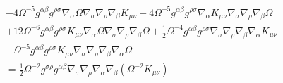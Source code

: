 \documentclass[10pt,letterpaper]{article}
\begin{document}
\begin{align}
 &- 4\Omega^{-5} g^{\alpha \beta} g^{\rho \sigma} \nabla_{\alpha}\Omega \nabla_{\sigma}\nabla_{\rho}\nabla_{\beta}K_{\mu \nu}- 4 \Omega^{-5}g^{\alpha \beta} g^{\rho \sigma} \nabla_{\alpha}K_{\mu \nu} \nabla_{\sigma}\nabla_{\rho}\nabla_{\beta}\Omega\nonumber \\
 & + 12\Omega^{-6} g^{\alpha \beta} g^{\rho \sigma} K_{\mu \nu} \nabla_{\alpha}\Omega \nabla_{\sigma}\nabla_{\rho}\nabla_{\beta}\Omega + \tfrac{1}{2}\Omega^{-4} g^{\alpha \beta} g^{\rho \sigma} \nabla_{\sigma}\nabla_{\rho}\nabla_{\beta}\nabla_{\alpha}K_{\mu \nu}\nonumber \\
 &-  \Omega^{-5}g^{\alpha \beta} g^{\rho \sigma} K_{\mu \nu} \nabla_{\sigma}\nabla_{\rho}\nabla_{\beta}\nabla_{\alpha}\Omega \nonumber \\
&= \frac12 \Omega^{-2} g^{\sigma\rho}g^{\alpha\beta}\nabla_\sigma\nabla_\rho\nabla_\alpha \nabla_\beta (\Omega^{-2}K_{\mu\nu}) 
\end{align}
\end{document}
